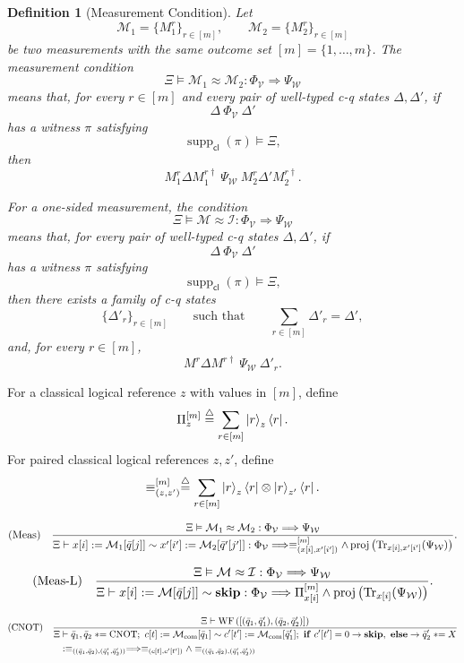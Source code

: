 \documentclass[acmsmall,screen,review,anonymous,nonacm]{acmart}
\newtheorem{definition}{Definition}[section]
\theoremstyle{defn_style}
\newcommand{\asteq}{\mathrel{*}=}
\begin{document}
\begin{definition}[Measurement Condition]
Let
\[
\mathcal M_1=\{M_1^{r}\}_{r\in[m]},
\qquad
\mathcal M_2=\{M_2^{r}\}_{r\in[m]}
\]
be two measurements with the same outcome set
\([m]=\{1,\ldots,m\}\). The measurement condition
\[
\Xi
\vDash
\mathcal M_1\approx\mathcal M_2:
\Phi_{\mathcal V}
\Longrightarrow
\Psi_{\mathcal W}
\]
means that, for every \(r\in[m]\) and every pair of well-typed
c-q states \(\Delta,\Delta'\), if
\[
\Delta\ \Phi_{\mathcal V}\ \Delta'
\]
has a witness \(\pi\) satisfying
\[
\operatorname{supp}_{\mathsf{cl}}(\pi)\models\Xi,
\]
then
\[
M_1^r\Delta M_1^{r\dagger}
\ \Psi_{\mathcal W}\
M_2^r\Delta'M_2^{r\dagger}.
\]

For a one-sided measurement, the condition
\[
\Xi
\vDash
\mathcal M\approx\mathcal I:
\Phi_{\mathcal V}
\Longrightarrow
\Psi_{\mathcal W}
\]
means that, for every pair of well-typed c-q states
\(\Delta,\Delta'\), if
\[
\Delta\ \Phi_{\mathcal V}\ \Delta'
\]
has a witness \(\pi\) satisfying
\[
\operatorname{supp}_{\mathsf{cl}}(\pi)\models\Xi,
\]
then there exists a family of c-q states
\[
\{\Delta'_r\}_{r\in[m]}
\qquad\text{such that}\qquad
\sum_{r\in[m]}\Delta'_r=\Delta',
\]
and, for every \(r\in[m]\),
\[
M^r\Delta M^{r\dagger}
\ \Psi_{\mathcal W}\
\Delta'_r.
\]
\end{definition}

For a classical logical reference \(z\) with values in \([m]\), define
\[
\Pi_z^{[m]}
\stackrel{\triangle}{=}
\sum_{r\in[m]}
\ket r_z\bra r .
\]
For paired classical logical references \(z,z'\), define
\[
\equiv^{[m]}_{(z,z')}
\stackrel{\triangle}{=}
\sum_{r\in[m]}
\ket r_z\bra r
\otimes
\ket r_{z'}\bra r .
\]

\[
\text{\rm (Meas)}
\quad
\frac{
\Xi
\vDash
\mathcal M_1\approx\mathcal M_2:
\Phi_{\mathcal V}
\Longrightarrow
\Psi_{\mathcal W}
}{
\Xi
\vdash
x[i]:=\mathcal M_1[\bar q[j]]
\sim
x'[i']:=\mathcal M_2[\bar q'[j']]
:
\Phi_{\mathcal V}
\Longrightarrow
\equiv^{[m]}_{(x[i],x'[i'])}
\land
\operatorname{proj}
\left(
\operatorname{Tr}_{x[i],x'[i']}(\Psi_{\mathcal W})
\right)
}.
\]

\[
\text{\rm (Meas-L)}
\quad
\frac{
\Xi
\vDash
\mathcal M\approx\mathcal I:
\Phi_{\mathcal V}
\Longrightarrow
\Psi_{\mathcal W}
}{
\Xi
\vdash
x[i]:=\mathcal M[\bar q[j]]
\sim
\mathbf{skip}
:
\Phi_{\mathcal V}
\Longrightarrow
\Pi^{[m]}_{x[i]}
\land
\operatorname{proj}
\left(
\operatorname{Tr}_{x[i]}(\Psi_{\mathcal W})
\right)
}.
\]



\[
\text{\rm (CNOT)}
\quad
\frac{
\Xi\vdash
\operatorname{WF}
\left(
[(\bar q_1,\bar q'_1),(\bar q_2,\bar q'_2)]
\right)
}{\begin{aligned}
\Xi
&\vdash
\bar q_1,\bar q_2\asteq \mathrm{CNOT};
\ c[t]:=\mathcal M_{\mathrm{com}}[\bar q_1]
\sim
c'[t']:=\mathcal M_{\mathrm{com}}[\bar q'_1];
\ \mathbf{if}\ c'[t']=0\rightarrow\mathbf{skip},
\ \mathbf{else}\rightarrow \bar q'_2\asteq X \\ 
&:
\equiv_{((\bar q_1,\bar q_2),(\bar q'_1,\bar q'_2))}
\Longrightarrow
\equiv_{(c[t],c'[t'])}
\land
\equiv_{((\bar q_1,\bar q_2),(\bar q'_1,\bar q'_2))}
\end{aligned}}
\]
\end{document}
